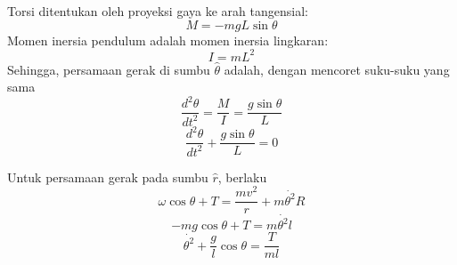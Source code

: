 \documentclass[12pt]{article}
\begin{document}
\begin{enumerate}[label=(\alph*)]
			Torsi ditentukan oleh proyeksi gaya ke arah tangensial:
			\begin{equation}
			M = -mgL\sin \theta
			\end{equation} 
			Momen inersia pendulum adalah momen inersia lingkaran:
			\begin{equation}
			I = mL^2
			\end{equation} 
			Sehingga, persamaan gerak di sumbu $\hat{\theta}$ adalah, dengan mencoret suku-suku yang sama
			\begin{equation}
			\dfrac{d^2\theta}{dt^2} = \dfrac {M}{I} =\dfrac{g \sin\theta}{L} 
			\end{equation} 
			\begin{equation}
			\dfrac{d^2\theta}{dt^2} +  \dfrac{g  \sin\theta}{L}  =0
			\end{equation} 
			
			Untuk persamaan gerak pada sumbu $ \hat{r}$, berlaku
			\begin{equation}
			\omega \cos \theta +T = \dfrac{mv^2}{r} + m\dot{\theta^2}R
			\end{equation}
			\begin{equation}
			-mg \cos \theta +T = m \dot{\theta^2}l
			\end{equation} 
		\begin{equation}
			 \dot{\theta^2}+\dfrac{g}{l} \cos \theta =\dfrac{T}{ml}
			\end{equation} 
			


\end{enumerate}
\end{document}
